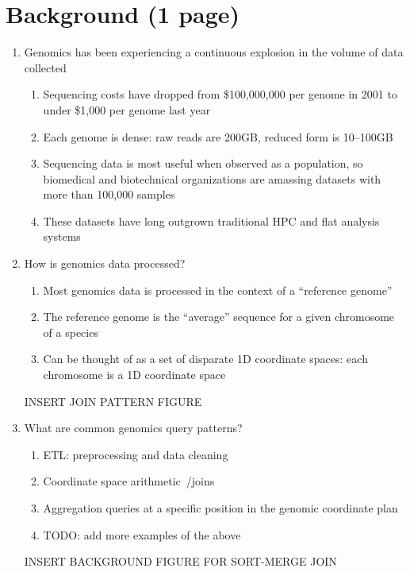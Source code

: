 \documentclass{vldb}
\begin{document}
\section{Background (1 page)}
\label{sec:background}

\begin{enumerate}
\item Genomics has been experiencing a continuous explosion in the volume of data
collected~\cite{stephens15}
\begin{enumerate}
\item Sequencing costs have dropped from \$100,000,000 per genome in 2001 to under
\$1,000 per genome last year
\item Each genome is dense: raw reads are 200GB, reduced form is 10--100GB
\item Sequencing data is most useful when observed as a population, so biomedical
and biotechnical organizations are amassing datasets with more than 100,000
samples~\cite{lek16}
\item These datasets have long outgrown traditional HPC and flat analysis systems
\end{enumerate}
\item How is genomics data processed?
\begin{enumerate}
\item Most genomics data is processed in the context of a ``reference genome''
\item The reference genome is the ``average'' sequence for a given chromosome
of a species
\item Can be thought of as a set of disparate 1D coordinate spaces: each
chromosome is a 1D coordinate space
\end{enumerate}

INSERT JOIN PATTERN FIGURE

\item What are common genomics query patterns?
\begin{enumerate}
\item ETL: preprocessing and data cleaning~\cite{massie13, nothaft15avocado}
\item Coordinate space arithmetic~\cite{quinlan10}/joins~\cite{nothaft15}
\item Aggregation queries at a specific position in the genomic coordinate plan
\item TODO: add more examples of the above
\end{enumerate}

INSERT BACKGROUND FIGURE FOR SORT-MERGE JOIN


\end{enumerate}
\end{document}
